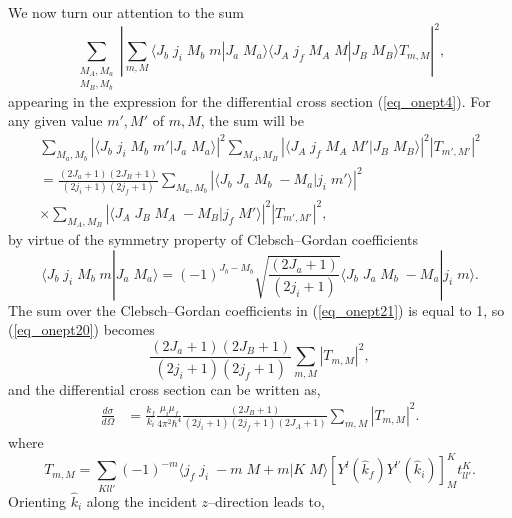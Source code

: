 We now turn our attention to the sum
\begin{equation}\label{eq_onept20}
\sum_{\substack{M_A,M_a\\M_B,M_b}}\left|\sum_{m,M}\langle J_b\;j_i\;M_b\;m|J_a\;M_a\rangle\langle J_A\;j_f\;M_A\;M|J_B\;M_B\rangle T_{m,M}\right|^2,
\end{equation}
appearing in the expression for the differential cross section (\ref{eq_onept4}). For any given value $m',M'$ of $m,M$, the sum will be
\begin{multline}\label{eq_onept21}
\sum_{M_a,M_b}\left|\langle J_b\;j_i\;M_b\;m'|J_a\;M_a\rangle\right|^2\sum_{M_A,M_B}\left|\langle J_A\;j_f\;M_A\;M'|J_B\;M_B\rangle\right|^2 \left|T_{m',M'}\right|^2\\
=\frac{(2J_a+1)(2J_B+1)}{(2j_i+1)(2j_f+1)}\sum_{M_a,M_b}\left|\langle J_b\;J_a\;M_b\;-M_a|j_i\;m'\rangle\right|^2\\
\times\sum_{M_A,M_B}\left|\langle J_A\;J_B\;M_A\;-M_B|j_f\;M'\rangle\right|^2 \left|T_{m',M'}\right|^2,
\end{multline}
by virtue of the symmetry property of Clebsch--Gordan coefficients
\begin{equation}\label{eq_onept22}
\langle J_b\;j_i\;M_b\;m|J_a\;M_a\rangle=(-1)^{J_b-M_b}\sqrt{\frac{(2J_a+1)}{(2j_i+1)}}\langle J_b\;J_a\;M_b\;-M_a|j_i\;m\rangle.
\end{equation}
The sum over the Clebsch--Gordan coefficients in (\ref{eq_onept21}) is equal to 1, so (\ref{eq_onept20}) becomes
 \begin{equation}\label{eq_onept23}
\frac{(2J_a+1)(2J_B+1)}{(2j_i+1)(2j_f+1)}\sum_{m,M}\left|T_{m,M}\right|^2,
\end{equation}
and the differential cross section  can be written as,
\begin{equation}\label{eq_onept24}
    \begin{split}
\frac{d\sigma}{d\Omega}&=\frac{k_f}{k_i}\frac{\mu_i\mu_f}{4\pi^2\hbar^4}
\frac{(2J_B+1)}{(2j_i+1)(2j_f+1)(2J_A+1)}\sum_{m,M}\left| T_{m,M}\right|^2.
    \end{split}
\end{equation}
where
\begin{equation}\label{eq_onept25}
T_{m,M}=\sum_{Kll'}(-1)^{-m}\langle j_f\;j_i\;-m\;M+m|K\;M\rangle\left[ Y^{l} (\hat k_f) Y^{l'} (\hat k_i)\right]^K_{M}t_{ll'}^K.
\end{equation}
Orienting $\hat k_i$ along the incident $z$--direction leads to,


